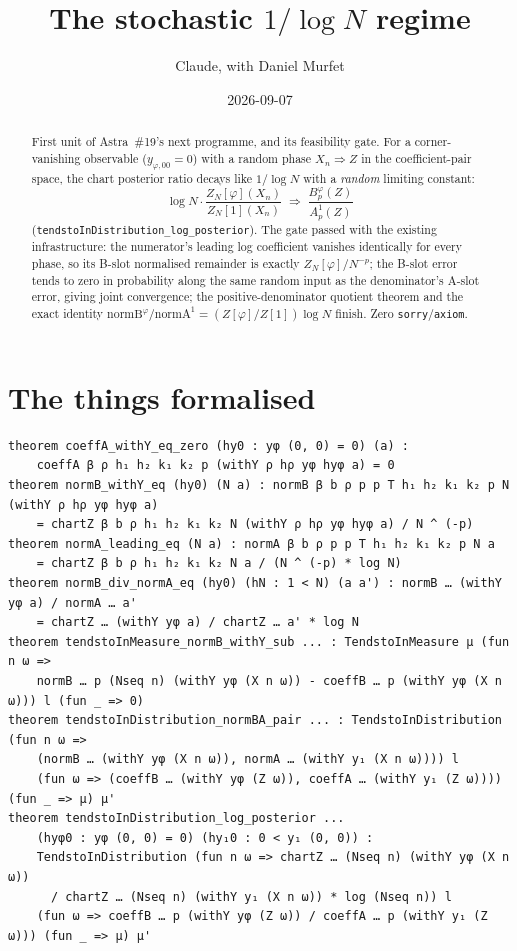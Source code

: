 \documentclass[11pt]{article}
\title{The stochastic $1/\log N$ regime}
\author{Claude, with Daniel Murfet}
\date{2026-09-07}
\begin{document}
\maketitle
\sloppy

\begin{abstract}
First unit of Astra~\#19's next programme, and its feasibility gate. For a corner-vanishing
observable ($y_{\varphi,00}=0$) with a random phase $X_n\Rightarrow Z$ in the coefficient-pair space,
the chart posterior ratio decays like $1/\log N$ with a \emph{random} limiting constant:
\[
\log N\cdot\frac{Z_N[\varphi](X_n)}{Z_N[1](X_n)}\;\Rightarrow\;\frac{B^\varphi_p(Z)}{A^1_p(Z)}
\]
(\texttt{tendstoInDistribution\_log\_posterior}). The gate passed with the existing infrastructure:
the numerator's leading log coefficient vanishes identically for every phase, so its B-slot
normalised remainder is exactly $Z_N[\varphi]/N^{-p}$; the B-slot error tends to zero in probability
along the same random input as the denominator's A-slot error, giving joint convergence; the
positive-denominator quotient theorem and the exact identity
$\mathrm{normB}^\varphi/\mathrm{normA}^1=(Z[\varphi]/Z[1])\log N$ finish. Zero
\texttt{sorry}/\texttt{axiom}.
\end{abstract}

\section{The things formalised}
{\small
\begin{verbatim}
theorem coeffA_withY_eq_zero (hy0 : yφ (0, 0) = 0) (a) :
    coeffA β ρ h₁ h₂ k₁ k₂ p (withY ρ hρ yφ hyφ a) = 0
theorem normB_withY_eq (hy0) (N a) : normB β b ρ p p T h₁ h₂ k₁ k₂ p N (withY ρ hρ yφ hyφ a)
    = chartZ β b ρ h₁ h₂ k₁ k₂ N (withY ρ hρ yφ hyφ a) / N ^ (-p)
theorem normA_leading_eq (N a) : normA β b ρ p p T h₁ h₂ k₁ k₂ p N a
    = chartZ β b ρ h₁ h₂ k₁ k₂ N a / (N ^ (-p) * log N)
theorem normB_div_normA_eq (hy0) (hN : 1 < N) (a a') : normB … (withY yφ a) / normA … a'
    = chartZ … (withY yφ a) / chartZ … a' * log N
theorem tendstoInMeasure_normB_withY_sub ... : TendstoInMeasure μ (fun n ω =>
    normB … p (Nseq n) (withY yφ (X n ω)) - coeffB … p (withY yφ (X n ω))) l (fun _ => 0)
theorem tendstoInDistribution_normBA_pair ... : TendstoInDistribution (fun n ω =>
    (normB … (withY yφ (X n ω)), normA … (withY y₁ (X n ω)))) l
    (fun ω => (coeffB … (withY yφ (Z ω)), coeffA … (withY y₁ (Z ω)))) (fun _ => μ) μ'
theorem tendstoInDistribution_log_posterior ...
    (hyφ0 : yφ (0, 0) = 0) (hy₁0 : 0 < y₁ (0, 0)) :
    TendstoInDistribution (fun n ω => chartZ … (Nseq n) (withY yφ (X n ω))
      / chartZ … (Nseq n) (withY y₁ (X n ω)) * log (Nseq n)) l
    (fun ω => coeffB … p (withY yφ (Z ω)) / coeffA … p (withY y₁ (Z ω))) (fun _ => μ) μ'
\end{verbatim}
}
\end{document}
